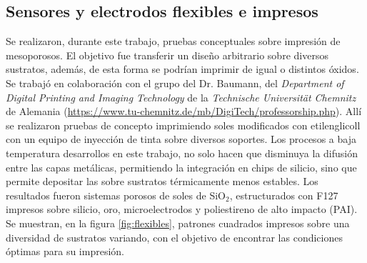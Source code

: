  	\subsection{Sensores y electrodos flexibles e impresos}

 	  Se realizaron, durante este trabajo, pruebas conceptuales sobre impresión de mesoporosos. El objetivo fue transferir un diseño arbitrario sobre diversos sustratos, además, de esta forma se podrían imprimir \pdm\space de igual o distintos óxidos. Se trabajó en colaboración con el grupo del Dr. Baumann, del \textit{Department of Digital Printing and Imaging Technology} de la \textit{Technische Universität Chemnitz} de Alemania (\url{https://www.tu-chemnitz.de/mb/DigiTech/professorship.php}). Allí se realizaron pruebas de concepto imprimiendo soles modificados con etilenglicoll con un equipo de inyección de tinta sobre diversos soportes. Los procesos a baja temperatura desarrollos en este trabajo, no solo hacen que disminuya la difusión entre las capas metálicas, permitiendo la integración en chips de silicio, sino que permite depositar las \pdm\space sobre sustratos térmicamente menos estables. Los resultados fueron sistemas porosos de soles de SiO$_2$, estructurados con F127 impresos sobre silicio, oro, microelectrodos y poliestireno de alto impacto (PAI). Se muestran, en la figura \ref{fig:flexibles}, patrones cuadrados impresos sobre una diversidad de sustratos variando, con el objetivo de encontrar las condiciones óptimas para su impresión.


